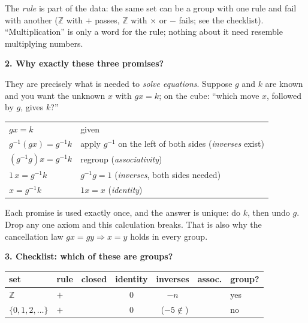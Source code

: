 \documentclass[10pt]{article}
\newcommand{\cmark}{\textcolor{why}{\ding{51}}}\newcommand{\xmark}{\textcolor{pit}{\ding{55}}}\usepackage{pifont}
\newcommand{\Z}{\mathbb{Z}}
\begin{document}
{\begin{minipage}[t]{744pt}
\begin{minipage}[t]{356pt}
\par\vspace{4pt}
\raggedright
The \emph{rule} is part of the data: the same set can be a group with one rule and fail with another ($\Z$ with $+$ passes, $\Z$ with $\times$ or $-$ fails; see the checklist). ``Multiplication'' is only a word for the rule; nothing about it need resemble multiplying numbers.\par\vspace{6pt}
{\sffamily\bfseries\color{big} 2. Why exactly these three promises?}\par\vspace{3pt}
They are precisely what is needed to \emph{solve equations}. Suppose $g$ and $k$ are known and you want the unknown $x$ with $gx=k$; on the cube: ``which move $x$, followed by $g$, gives $k$?''
\begin{center}
\begin{tabular}{@{}ll@{}}
$gx=k$ & given\\
$g^{-1}(gx)=g^{-1}k$ & apply $g^{-1}$ on the left of both sides \quad(\emph{inverses} exist)\\
$(g^{-1}g)x=g^{-1}k$ & regroup \quad(\emph{associativity})\\
$1\,x=g^{-1}k$ & $g^{-1}g=1$ \quad(\emph{inverses}, both sides needed)\\
$x=g^{-1}k$ & $1x=x$ \quad(\emph{identity})\\
\end{tabular}
\end{center}
Each promise is used exactly once, and the answer is unique: do $k$, then undo $g$. Drop any one axiom and this calculation breaks. That is also why the cancellation law $gx=gy\Rightarrow x=y$ holds in every group.
\end{minipage}\hfill
\begin{minipage}[t]{372pt}\vspace{0pt}
{\sffamily\bfseries\color{big} 3. Checklist: which of these are groups?}\par\vspace{3pt}
\centering
\begin{tabular}{@{}llccccl@{}}
\toprule
set & rule & closed & identity & inverses & assoc. & group?\\
\midrule
$\Z$ & $+$ & \cmark & $0$ & $-n$ & \cmark & yes\\
$\{0,1,2,\dots\}$ & $+$ & \cmark & $0$ & \xmark\ ($-5\notin$) & \cmark & no\\

\end{tabular}
\end{minipage}
\end{minipage}}
\end{document}
